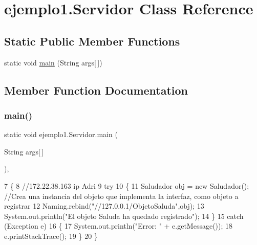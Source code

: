 \hypertarget{classejemplo1_1_1_servidor}{}\section{ejemplo1.\+Servidor Class Reference}
\label{classejemplo1_1_1_servidor}
\subsection*{Static Public Member Functions}
\begin{DoxyCompactItemize}
\item 
static void \mbox{\hyperlink{classejemplo1_1_1_servidor_a01ab924128686eafcc02f87b4c05b16b}{main}} (String args\mbox{[}$\,$\mbox{]})
\end{DoxyCompactItemize}


\subsection{Member Function Documentation}
\mbox{\label{classejemplo1_1_1_servidor_a01ab924128686eafcc02f87b4c05b16b}} 
\subsubsection{\texorpdfstring{main()}{main()}}
{\footnotesize\ttfamily static void ejemplo1.\+Servidor.\+main (\begin{DoxyParamCaption}\item[{String}]{args\mbox{[}$\,$\mbox{]} }\end{DoxyParamCaption})\hspace{0.3cm}{\ttfamily [inline]}, {\ttfamily [static]}}


\begin{DoxyCode}
7     \{
8         \textcolor{comment}{//172.22.38.163 ip Adri}
9         \textcolor{keywordflow}{try}
10         \{
11             Saludador obj = \textcolor{keyword}{new} Saludador(); \textcolor{comment}{//Crea una instancia del objeto que implementa la interfaz,
       como objeto a registrar}
12             Naming.rebind(\textcolor{stringliteral}{"//127.0.0.1/ObjetoSaluda"},obj);
13             System.out.println(\textcolor{stringliteral}{"El objeto Saluda ha quedado registrado"});
14         \}
15         \textcolor{keywordflow}{catch} (Exception e)
16         \{
17             System.out.println(\textcolor{stringliteral}{"Error: "} + e.getMessage());
18             e.printStackTrace();
19         \}
20     \}
\end{DoxyCode}
